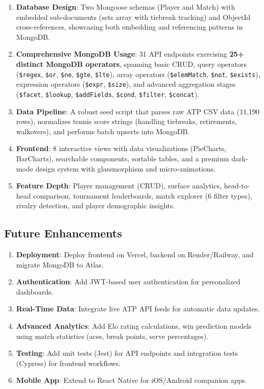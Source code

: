 \documentclass[12pt,a4paper]{article}
\begin{document}
\begin{enumerate}
    \item \textbf{Database Design}: Two Mongoose schemas (Player and Match) with embedded sub-documents (sets array with tiebreak tracking) and ObjectId cross-references, showcasing both embedding and referencing patterns in MongoDB.

    \item \textbf{Comprehensive MongoDB Usage}: 31 API endpoints exercising \textbf{25+ distinct MongoDB operators}, spanning basic CRUD, query operators (\texttt{\$regex}, \texttt{\$or}, \texttt{\$ne}, \texttt{\$gte}, \texttt{\$lte}), array operators (\texttt{\$elemMatch}, \texttt{\$not}, \texttt{\$exists}), expression operators (\texttt{\$expr}, \texttt{\$size}), and advanced aggregation stages (\texttt{\$facet}, \texttt{\$lookup}, \texttt{\$addFields}, \texttt{\$cond}, \texttt{\$filter}, \texttt{\$concat}).

    \item \textbf{Data Pipeline}: A robust seed script that parses raw ATP CSV data (11,190 rows), normalizes tennis score strings (handling tiebreaks, retirements, walkovers), and performs batch upserts into MongoDB.

    \item \textbf{Frontend}: 8 interactive views with data visualizations (PieCharts, BarCharts), searchable components, sortable tables, and a premium dark-mode design system with glassmorphism and micro-animations.

    \item \textbf{Feature Depth}: Player management (CRUD), surface analytics, head-to-head comparison, tournament leaderboards, match explorer (6 filter types), rivalry detection, and player demographic insights.
\end{enumerate}

\subsection{Future Enhancements}

\begin{enumerate}[noitemsep]
    \item \textbf{Deployment}: Deploy frontend on Vercel, backend on Render/Railway, and migrate MongoDB to Atlas.
    \item \textbf{Authentication}: Add JWT-based user authentication for personalized dashboards.
    \item \textbf{Real-Time Data}: Integrate live ATP API feeds for automatic data updates.
    \item \textbf{Advanced Analytics}: Add Elo rating calculations, win prediction models using match statistics (aces, break points, serve percentages).

    \item \textbf{Testing}: Add unit tests (Jest) for API endpoints and integration tests (Cypress) for frontend workflows.
    \item \textbf{Mobile App}: Extend to React Native for iOS/Android companion apps.
\end{enumerate}
\end{document}
